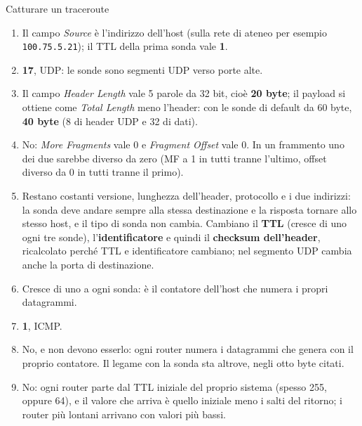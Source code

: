 \begin{esercizio}{Catturare un traceroute}
\svolgimento
\begin{enumerate}[label=(\alph*)]
    \item Il campo \emph{Source} è l'indirizzo dell'host (sulla rete di ateneo per esempio \texttt{100.75.5.21}); il TTL
          della prima sonda vale \textbf{1}.
    \item \textbf{17}, UDP: le sonde sono segmenti UDP verso porte alte.
    \item Il campo \emph{Header Length} vale 5 parole da 32 bit, cioè \textbf{20 byte}; il payload si ottiene come
          \emph{Total Length} meno l'header: con le sonde di default da 60 byte, \textbf{40 byte} (8 di header UDP e 32 di dati).
    \item No: \emph{More Fragments} vale 0 e \emph{Fragment Offset} vale 0. In un frammento uno dei due sarebbe diverso da
          zero (MF a 1 in tutti tranne l'ultimo, offset diverso da 0 in tutti tranne il primo).
    \item Restano costanti versione, lunghezza dell'header, protocollo e i due indirizzi: la sonda deve andare sempre alla stessa
          destinazione e la risposta tornare allo stesso host, e il tipo di sonda non cambia. Cambiano il \textbf{TTL} (cresce
          di uno ogni tre sonde), l'\textbf{identificatore} e quindi il \textbf{checksum dell'header}, ricalcolato perché TTL e
          identificatore cambiano; nel segmento UDP cambia anche la porta di destinazione.
    \item Cresce di uno a ogni sonda: è il contatore dell'host che numera i propri datagrammi.
    \item \textbf{1}, ICMP.
    \item No, e non devono esserlo: ogni router numera i datagrammi che genera con il proprio contatore. Il legame con la
          sonda sta altrove, negli otto byte citati.
    \item No: ogni router parte dal TTL iniziale del proprio sistema (spesso 255, oppure 64), e il valore che arriva è quello
          iniziale meno i salti del ritorno; i router più lontani arrivano con valori più bassi.
\end{enumerate}
\end{esercizio}

